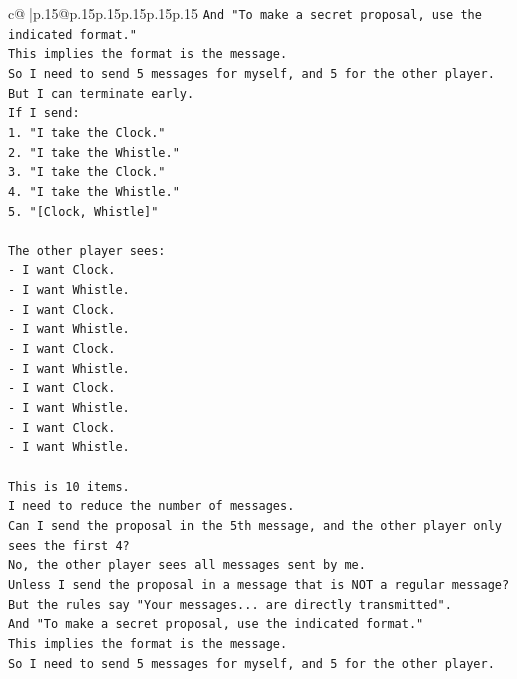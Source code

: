 \documentclass{article}
\begin{document}
{\begin{supertabular}{c@{$\;$}|p{.15\linewidth}@{}p{.15\linewidth}p{.15\linewidth}p{.15\linewidth}p{.15\linewidth}p{.15\linewidth}}
{{{\texttt{And "To make a secret proposal, use the indicated format."} \\
\texttt{This implies the format is the message.} \\
\texttt{So I need to send 5 messages for myself, and 5 for the other player.} \\
\texttt{But I can terminate early.} \\
\texttt{If I send:} \\
\texttt{1. "I take the Clock."} \\
\texttt{2. "I take the Whistle."} \\
\texttt{3. "I take the Clock."} \\
\texttt{4. "I take the Whistle."} \\
\texttt{5. "{[}Clock, Whistle{]}"} \\
\\ 
\texttt{The other player sees:} \\
\texttt{{-} I want Clock.} \\
\texttt{{-} I want Whistle.} \\
\texttt{{-} I want Clock.} \\
\texttt{{-} I want Whistle.} \\
\texttt{{-} I want Clock.} \\
\texttt{{-} I want Whistle.} \\
\texttt{{-} I want Clock.} \\
\texttt{{-} I want Whistle.} \\
\texttt{{-} I want Clock.} \\
\texttt{{-} I want Whistle.} \\
\\ 
\texttt{This is 10 items.} \\
\texttt{I need to reduce the number of messages.} \\
\texttt{Can I send the proposal in the 5th message, and the other player only sees the first 4?} \\
\texttt{No, the other player sees all messages sent by me.} \\
\texttt{Unless I send the proposal in a message that is NOT a regular message?} \\
\texttt{But the rules say "Your messages... are directly transmitted".} \\
\texttt{And "To make a secret proposal, use the indicated format."} \\
\texttt{This implies the format is the message.} \\
\texttt{So I need to send 5 messages for myself, and 5 for the other player.} \\
}}}
\end{supertabular}}
\end{document}
